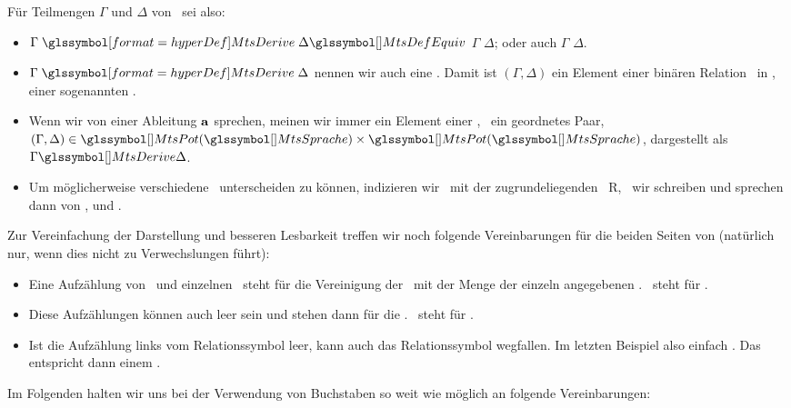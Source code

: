 Für Teilmengen $\Gamma$ und $\Delta$ von \MtsSprache\ sei also:
\begin{itemize}
	\item $\Gamma \defSymBin{\MtsDerive} \Delta \MtsDefEquiv$ $\Gamma$  $\Delta$; oder auch $\Gamma$  $\Delta$.
	\item $\Gamma \defSymBin{\MtsDerive} \Delta$ nennen wir auch eine   \MtsSprache.
	Damit ist $(\Gamma,\Delta)$ ein Element einer binären Relation \MtsDerive\ in \MtsPotSprache, einer sogenannten .
	\item Wenn wir von einer Ableitung $\mathbf{a}$ sprechen, meinen wir immer ein Element einer \Ableitungsrelation, \textdh\ ein geordnetes Paar, \textzB\ $(\Gamma, \Delta) \in \MtsPotSprache \times \MtsPotSprache$, dargestellt als $\Gamma \MtsDerive \Delta$.
	\item Um möglicherweise verschiedene \Ableitungsrelationen\ unterscheiden zu können, indizieren wir  \textggf\ mit der zugrundeliegenden \Relation\ R, \textdh\ wir schreiben  und sprechen dann von ,  und .
\end{itemize}
%
Zur Vereinfachung der Darstellung und besseren Lesbarkeit treffen wir noch folgende Vereinbarungen für die beiden Seiten von \seqqt{$\Gamma \MtsDerive \Delta$} (natürlich nur, wenn dies nicht zu Verwechslungen führt):
\begin{itemize}
	\item Eine Aufzählung von \Formelmengen\ und einzelnen \Formeln\ steht für die Vereinigung der \Formelmengen\ mit der Menge der einzeln angegebenen \Formeln.
	\textZB\ steht \seqqt{$\Gamma, \alpha \MtsDerive \beta$} für \seqqt{$(\Gamma \cup \{\alpha\}) \MtsDerive \{\beta\}$}.
	\item Diese Aufzählungen können auch leer sein und stehen dann für die \leereMenge. \textZB\ steht \seqqt{$\MtsDerive\; \alpha \OjkImp (\beta \OjkImp \alpha)$} für \seqqt{$\emptyset \MtsDerive \{\alpha \OjkImp (\beta \OjkImp \alpha)\}$}.
	\item Ist die Aufzählung links vom Relationssymbol \chrqt{\MtsDerive} leer, kann auch das Relationssymbol wegfallen.
	Im letzten Beispiel also einfach \seqqt{$\{\alpha \OjkImp (\beta \OjkImp \alpha)\}$}.
	Das entspricht dann einem .
\end{itemize}
%
Im Folgenden halten wir uns bei der Verwendung von Buchstaben so weit wie möglich an folgende Vereinbarungen:%
